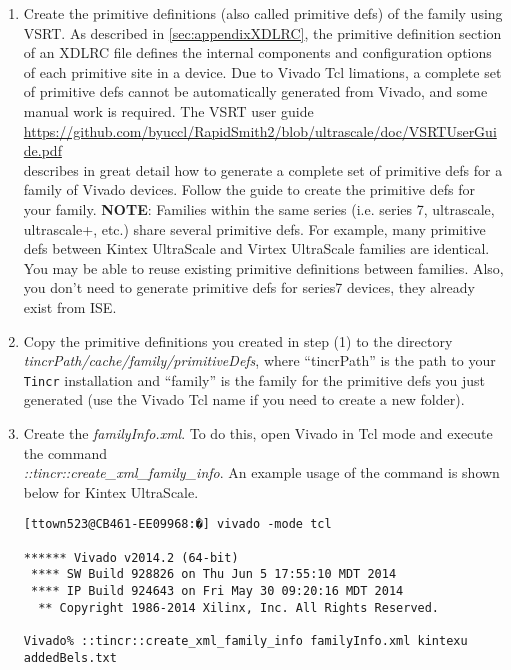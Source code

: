 \begin {enumerate}
  \item Create the primitive definitions (also called primitive defs) of the
  family using VSRT. As described in \autoref{sec:appendixXDLRC}, the primitive
  definition section of an XDLRC file defines the internal components and
  configuration options of each primitive site in a device. Due to Vivado Tcl
  limations, a complete set of primitive defs cannot be automatically generated from Vivado,
  and some manual work is required. The VSRT user guide 
  {\color{blue}\url{https://github.com/byuccl/RapidSmith2/blob/ultrascale/doc/VSRTUserGuide.pdf}}\\ 
  describes in great detail how to generate a complete set of primitive defs
  for a family of Vivado devices. Follow the guide to create the primitive defs
  for your family. \textbf{NOTE}: Families within the same series (i.e. series
  7, ultrascale, ultrascale+, etc.) share several primitive defs. For example,
  many primitive defs between Kintex UltraScale and Virtex UltraScale families
  are identical. You may be able to reuse existing primitive definitions
  between families. Also, you don't need to generate primitive defs for series7
  devices, they already exist from ISE.
  
  \item Copy the primitive definitions you created in step (1) to the
   directory \textit{tincrPath/cache/family/primitiveDefs}, where ``tincrPath''
   is the path to your \texttt{Tincr} installation and ``family'' is the family
   for the primitive defs you just generated (use the Vivado Tcl name if you
   need to create a new folder).
   
   \item Create the \textit{familyInfo.xml}. To do this, open Vivado in Tcl mode
   and execute the command \\
   \textit{::tincr::create\_xml\_family\_info}. An example usage of the command
   is shown below for Kintex UltraScale. 
   
\begin{lstlisting}[numbers=none]
[ttown523@CB461-EE09968:�] vivado -mode tcl

****** Vivado v2014.2 (64-bit)
 **** SW Build 928826 on Thu Jun 5 17:55:10 MDT 2014
 **** IP Build 924643 on Fri May 30 09:20:16 MDT 2014
  ** Copyright 1986-2014 Xilinx, Inc. All Rights Reserved.

Vivado% ::tincr::create_xml_family_info familyInfo.xml kintexu addedBels.txt 
\end{lstlisting}
	

\end{enumerate}
